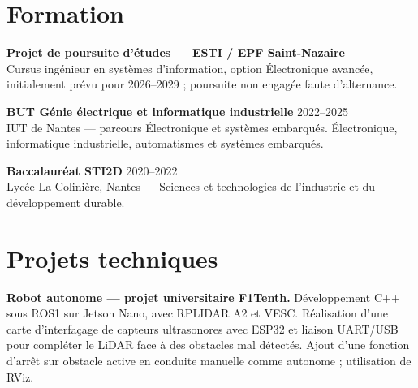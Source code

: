 \documentclass[10pt,a4paper]{article}
\begin{document}
\vspace{0.6cm}


\section{Formation}
\vspace{0.2cm}

\textbf{Projet de poursuite d'études ---
ESTI / EPF Saint-Nazaire}\\

Cursus ingénieur en systèmes d'information,
option Électronique avancée, initialement prévu pour
2026--2029 ; poursuite non engagée faute d'alternance.\par

\vspace{0.5cm}

\textbf{BUT Génie électrique et informatique industrielle}
\hfill 2022--2025\\

IUT de Nantes --- parcours Électronique et systèmes embarqués.
Électronique, informatique industrielle, automatismes et
systèmes embarqués.\par

\vspace{0.5cm}

\textbf{Baccalauréat STI2D}
\hfill 2020--2022\\

Lycée La Colinière, Nantes --- Sciences et technologies
de l'industrie et du développement durable.

\vspace{0.6cm}

\section{Projets techniques}

\vspace{0.2cm}

\textbf{Robot autonome --- projet universitaire F1Tenth.}
Développement C++ sous ROS1 sur Jetson Nano, avec RPLIDAR A2
et VESC. Réalisation d'une carte d'interfaçage de capteurs
ultrasonores avec ESP32 et liaison UART/USB pour compléter
le LiDAR face à des obstacles mal détectés. Ajout d'une
fonction d'arrêt sur obstacle active en conduite manuelle
comme autonome ; utilisation de RViz.\par
\end{document}
